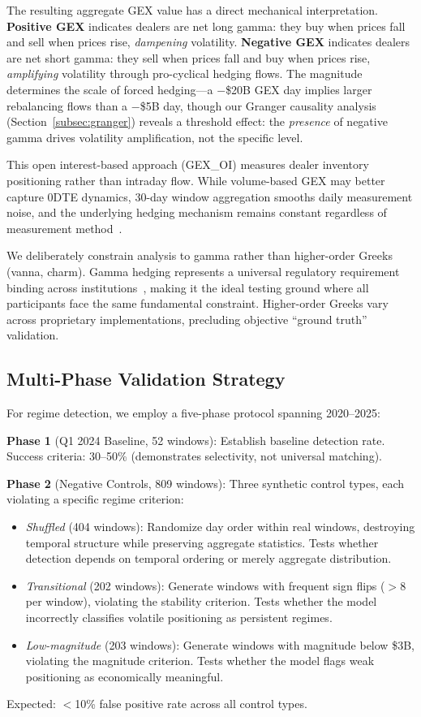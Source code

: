 The resulting aggregate GEX value has a direct mechanical interpretation. \textbf{Positive GEX} indicates dealers are net long gamma: they buy when prices fall and sell when prices rise, \textit{dampening} volatility. \textbf{Negative GEX} indicates dealers are net short gamma: they sell when prices fall and buy when prices rise, \textit{amplifying} volatility through pro-cyclical hedging flows. The magnitude determines the scale of forced hedging---a $-$\$20B GEX day implies larger rebalancing flows than a $-$\$5B day, though our Granger causality analysis (Section~\ref{subsec:granger}) reveals a threshold effect: the \textit{presence} of negative gamma drives volatility amplification, not the specific level.

This open interest-based approach (GEX\_OI) measures dealer inventory positioning rather than intraday flow. While volume-based GEX may better capture 0DTE dynamics, 30-day window aggregation smooths daily measurement noise, and the underlying hedging mechanism remains constant regardless of measurement method~\cite{dim2025zero}.

We deliberately constrain analysis to gamma rather than higher-order Greeks (vanna, charm). Gamma hedging represents a universal regulatory requirement binding across institutions~\cite{mixon2009}, making it the ideal testing ground where all participants face the same fundamental constraint. Higher-order Greeks vary across proprietary implementations, precluding objective ``ground truth'' validation.

\subsection{Multi-Phase Validation Strategy}

For regime detection, we employ a five-phase protocol spanning 2020--2025:

\textbf{Phase 1} (Q1 2024 Baseline, 52 windows): Establish baseline detection rate. Success criteria: 30--50\% (demonstrates selectivity, not universal matching).

\textbf{Phase 2} (Negative Controls, 809 windows): Three synthetic control types, each violating a specific regime criterion:
\begin{itemize}
    \item \textit{Shuffled} (404 windows): Randomize day order within real windows, destroying temporal structure while preserving aggregate statistics. Tests whether detection depends on temporal ordering or merely aggregate distribution.
    \item \textit{Transitional} (202 windows): Generate windows with frequent sign flips ($>$8 per window), violating the stability criterion. Tests whether the model incorrectly classifies volatile positioning as persistent regimes.
    \item \textit{Low-magnitude} (203 windows): Generate windows with magnitude below \$3B, violating the magnitude criterion. Tests whether the model flags weak positioning as economically meaningful.
\end{itemize}
Expected: $<$10\% false positive rate across all control types.

